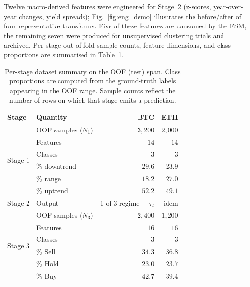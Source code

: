 \documentclass[conference]{IEEEtran}
\begin{document}
Twelve macro-derived features were engineered for Stage~2 (z-scores, year-over-year changes, yield spreads); Fig.~\ref{fig:eng_demo} illustrates the before/after of four representative transforms. Five of these features are consumed by the FSM; the remaining seven were produced for unsupervised clustering trials and archived. Per-stage out-of-fold sample counts, feature dimensions, and class proportions are summarised in Table~\ref{tab:dataset}.

\begin{table}[t]
\centering
\caption{Per-stage dataset summary on the OOF (test) span. Class proportions are computed from the ground-truth labels appearing in the OOF range. Sample counts reflect the number of rows on which that stage emits a prediction.}
\label{tab:dataset}
\setlength{\tabcolsep}{4pt}
\renewcommand{\arraystretch}{1.05}
\begin{tabular}{@{}llrr@{}}
\toprule
Stage & Quantity & BTC & ETH \\
\midrule
\multirow{6}{*}{Stage 1} & OOF samples ($N_1$)  & $3{,}200$ & $2{,}000$ \\
                        & Features             & $14$      & $14$      \\
                        & Classes              & $3$       & $3$       \\
                        & \% downtrend         & $29.6$    & $23.9$    \\
                        & \% range             & $18.2$    & $27.0$    \\
                        & \% uptrend           & $52.2$    & $49.1$    \\
\midrule
Stage 2                 & Output               & 1-of-3 regime $+$ $\tau_t$ & idem \\
\midrule
\multirow{6}{*}{Stage 3} & OOF samples ($N_3$)  & $2{,}400$ & $1{,}200$ \\
                        & Features             & $16$      & $16$      \\
                        & Classes              & $3$       & $3$       \\
                        & \% Sell              & $34.3$    & $36.8$    \\
                        & \% Hold              & $23.0$    & $23.7$    \\
                        & \% Buy               & $42.7$    & $39.4$    \\
\bottomrule
\end{tabular}
\end{table}
\end{document}
